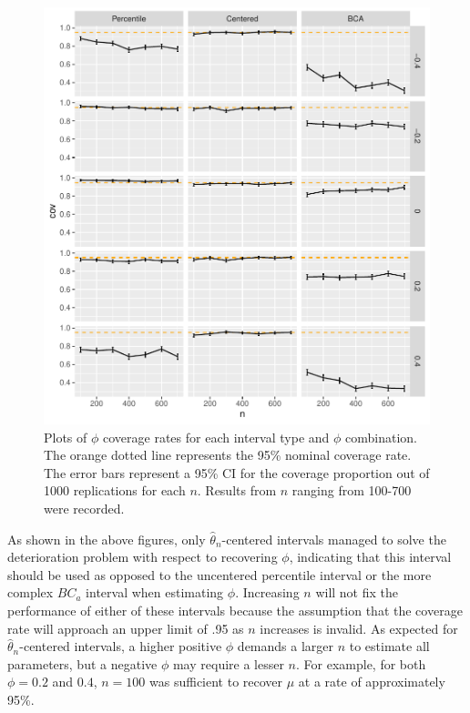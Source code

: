 \documentclass[12pt, letterpaper, titlepage]{article}
\begin{document}
\begin{figure}[tbp]
  \centering
  \includegraphics[width=\textwidth]{figures/plot_phi}
  \caption{Plots of $\phi$ coverage rates for each interval type and $\phi$
    combination. The orange dotted line represents the 95\% nominal coverage
    rate. The error bars represent a 95\% CI for the coverage
    proportion out of 1000 replications for each $n$. Results from $n$
    ranging from 100-700 were recorded.}
  \label{fig:phi}
\end{figure}


As shown in the above figures, only $\hat{\theta}_{n}$-centered intervals
managed to solve the deterioration problem with respect to recovering $\phi$,
indicating that this interval should be used as opposed to the uncentered
percentile interval or the more complex $BC_a$ interval when estimating
$\phi$. Increasing $n$ will not fix the performance of either of these
intervals because the assumption that the coverage rate will approach an upper
limit of .95 as $n$ increases is invalid. As expected for
$\hat{\theta}_{n}$-centered intervals, a higher positive $\phi$ demands a
larger $n$ to estimate all parameters, but a negative $\phi$ may require a
lesser $n$. For example, for both $\phi = 0.2$ and $0.4$, $n = 100$ was
sufficient to recover $\mu$ at a rate of approximately 95\%.
\end{document}
